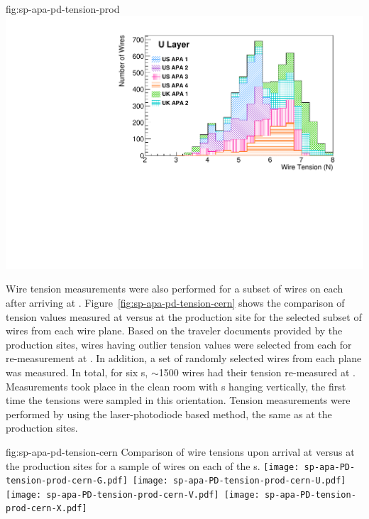 \begin{dunefigure}{fig:sp-apa-pd-tension-prod}
\includegraphics[height=0.28\textheight,trim=0mm 0mm 0mm 0mm,clip]{graphics/sp-apa-U-layer-tensions.pdf}
\end{dunefigure}

Wire tension measurements were also performed for a subset of wires on each  after arriving at . Figure~\ref{fig:sp-apa-pd-tension-cern} shows the comparison of tension values measured at  versus at the production site for the selected subset of wires from each wire plane. Based on the traveler documents provided by the production sites, wires having outlier tension values were selected from each  for re-measurement at . In addition, a set of randomly selected wires from each plane was measured. In total, for six s, $\sim$1500 wires had their tension re-measured at . Measurements took place in the clean room with s hanging vertically, the first time the tensions were sampled in this orientation. Tension measurements were performed by using the laser-photodiode based method, the same as at the production sites. 

\begin{dunefigure}{fig:sp-apa-pd-tension-cern}
{Comparison of wire tensions upon arrival at  versus at the production sites for a sample of wires on each of the  s.}
\mbox{\texttt{[image: sp-apa-PD-tension-prod-cern-G.pdf]} %
\texttt{[image: sp-apa-PD-tension-prod-cern-U.pdf]}} \\
\vspace{3mm}
\mbox{\texttt{[image: sp-apa-PD-tension-prod-cern-V.pdf]} %
\texttt{[image: sp-apa-PD-tension-prod-cern-X.pdf]}}
\end{dunefigure}

